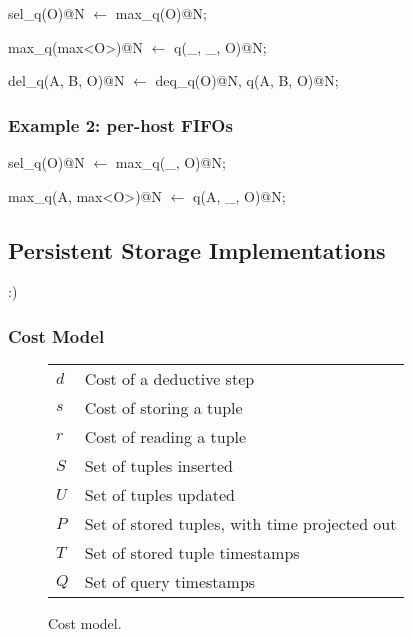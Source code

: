 \begin{Dedalus}
sel\_q(O)@N \(\leftarrow\)
  max\_q(O)@N;

max\_q(max<O>)@N \(\leftarrow\)
  q(\_, \_, O)@N;

del\_q(A, B, O)@N \(\leftarrow\)
  deq\_q(O)@N,
  q(A, B, O)@N;
\end{Dedalus}

\subsubsection{Example 2: per-host FIFOs}

\begin{Dedalus}
sel\_q(O)@N \(\leftarrow\)
  max\_q(_, O)@N; 

max\_q(A, max<O>)@N \(\leftarrow\)
  q(A, \_, O)@N;
\end{Dedalus}


\subsection{Persistent Storage Implementations}

:)

\subsubsection{Cost Model}

\begin{figure}[t]
\begin{tabular}{ll} \hline
$d$ & Cost of a deductive step \\
$s$ & Cost of storing a tuple \\
$r$ & Cost of reading a tuple \\ 
\hline
$S$ & Set of tuples inserted \\
$U$ & Set of tuples updated \\
$P$ & Set of stored tuples, with time projected out \\ 
$T$ & Set of stored tuple timestamps \\ 
$Q$ & Set of query timestamps \\ \hline 
\end{tabular}
\caption{Cost model.}
\label{fig:breakdown}
\end{figure}


